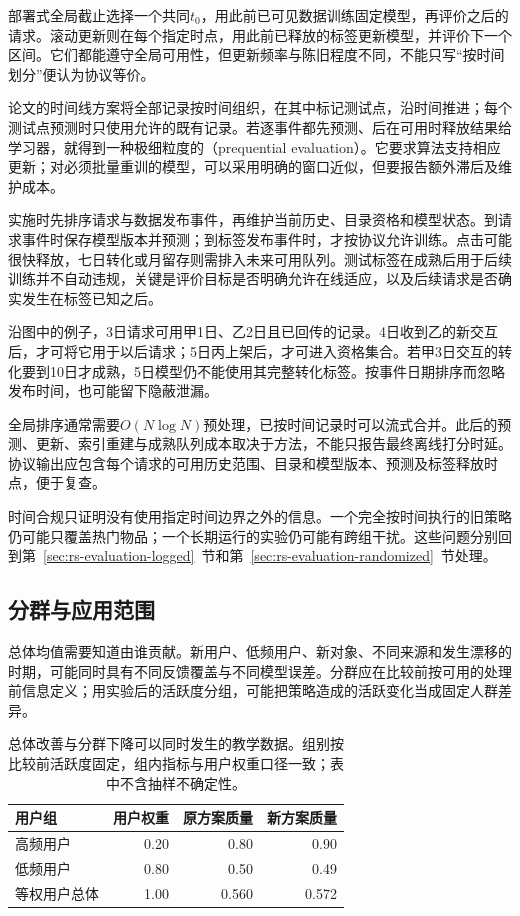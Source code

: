 部署式全局截止选择一个共同$t_0$，用此前已可见数据训练固定模型，再评价之后的请求。滚动更新则在每个指定时点，用此前已释放的标签更新模型，并评价下一个区间。它们都能遵守全局可用性，但更新频率与陈旧程度不同，不能只写“按时间划分”便认为协议等价。

论文的时间线方案将全部记录按时间组织，在其中标记测试点，沿时间推进；每个测试点预测时只使用允许的既有记录。若逐事件都先预测、后在可用时释放结果给学习器，就得到一种极细粒度的（prequential evaluation）。它要求算法支持相应更新；对必须批量重训的模型，可以采用明确的窗口近似，但要报告额外滞后及维护成本。

实施时先排序请求与数据发布事件，再维护当前历史、目录资格和模型状态。到请求事件时保存模型版本并预测；到标签发布事件时，才按协议允许训练。点击可能很快释放，七日转化或月留存则需排入未来可用队列。测试标签在成熟后用于后续训练并不自动违规，关键是评价目标是否明确允许在线适应，以及后续请求是否确实发生在标签已知之后。

沿图中的例子，3日请求可用甲1日、乙2日且已回传的记录。4日收到乙的新交互后，才可将它用于以后请求；5日丙上架后，才可进入资格集合。若甲3日交互的转化要到10日才成熟，5日模型仍不能使用其完整转化标签。按事件日期排序而忽略发布时间，也可能留下隐蔽泄漏。

全局排序通常需要$O(N\log N)$预处理，已按时间记录时可以流式合并。此后的预测、更新、索引重建与成熟队列成本取决于方法，不能只报告最终离线打分时延。协议输出应包含每个请求的可用历史范围、目录和模型版本、预测及标签释放时点，便于复查。

时间合规只证明没有使用指定时间边界之外的信息。一个完全按时间执行的旧策略仍可能只覆盖热门物品；一个长期运行的实验仍可能有跨组干扰。这些问题分别回到第~\ref{sec:rs-evaluation-logged}~节和第~\ref{sec:rs-evaluation-randomized}~节处理。

\subsection{分群与应用范围}
\label{sec:rs-evaluation-groups}

总体均值需要知道由谁贡献。新用户、低频用户、新对象、不同来源和发生漂移的时期，可能同时具有不同反馈覆盖与不同模型误差。分群应在比较前按可用的处理前信息定义；用实验后的活跃度分组，可能把策略造成的活跃变化当成固定人群差异。

\begin{table}[htbp]
  \centering
  \small
  \begin{tabularx}{\linewidth}{@{}Xrrr@{}}
    \toprule
    用户组 & 用户权重 & 原方案质量 & 新方案质量\\
    \midrule
    高频用户 & 0.20 & 0.80 & 0.90\\
    低频用户 & 0.80 & 0.50 & 0.49\\
    等权用户总体 & 1.00 & 0.560 & 0.572\\
    \bottomrule
  \end{tabularx}
  \caption{总体改善与分群下降可以同时发生的教学数据。组别按比较前活跃度固定，组内指标与用户权重口径一致；表中不含抽样不确定性。}
  \label{tab:rs-evaluation-groups}
\end{table}

